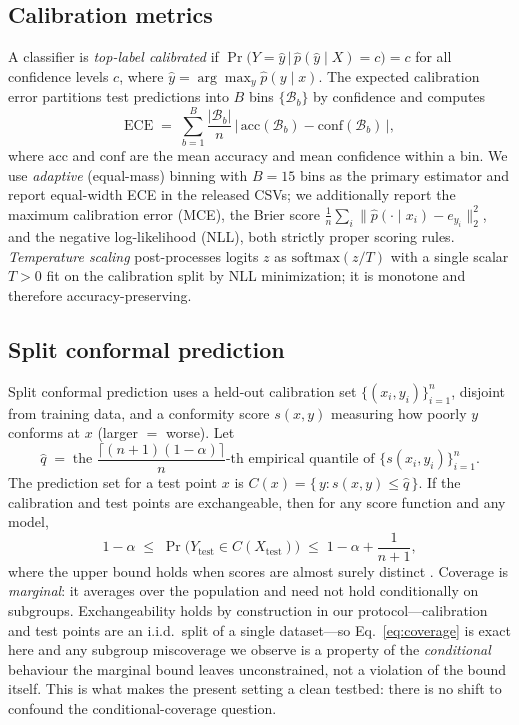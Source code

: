 \documentclass[review,12pt]{elsarticle}
\begin{document}
\subsection{Calibration metrics}
A classifier is \emph{top-label calibrated} if $\Pr\!\big(Y = \hat y \,\big|\, \hat p(\hat y \mid X) = c\big) = c$ for all confidence levels $c$, where $\hat y = \arg\max_y \hat p(y\mid x)$. The expected calibration error partitions test predictions into $B$ bins $\{\mathcal{B}_b\}$ by confidence and computes
\begin{equation}
\mathrm{ECE} \;=\; \sum_{b=1}^{B} \frac{|\mathcal{B}_b|}{n} \,\Big|\, \mathrm{acc}(\mathcal{B}_b) - \mathrm{conf}(\mathcal{B}_b) \,\Big| ,
\label{eq:ece}
\end{equation}
where $\mathrm{acc}$ and $\mathrm{conf}$ are the mean accuracy and mean confidence within a bin. We use \emph{adaptive} (equal-mass) binning with $B = 15$ bins as the primary estimator and report equal-width ECE in the released CSVs; we additionally report the maximum calibration error (MCE), the Brier score $\frac1n\sum_i \|\hat p(\cdot\mid x_i) - e_{y_i}\|_2^2$, and the negative log-likelihood (NLL), both strictly proper scoring rules. \emph{Temperature scaling} \cite{guo2017} post-processes logits $z$ as $\mathrm{softmax}(z/T)$ with a single scalar $T>0$ fit on the calibration split by NLL minimization; it is monotone and therefore accuracy-preserving.

\subsection{Split conformal prediction}
Split conformal prediction \cite{papadopoulos2002,vovk2005} uses a held-out calibration set $\{(x_i, y_i)\}_{i=1}^{n}$, disjoint from training data, and a conformity score $s(x,y)$ measuring how poorly $y$ conforms at $x$ (larger $=$ worse). Let
\begin{equation}
\hat q \;=\; \text{the } \frac{\lceil (n+1)(1-\alpha) \rceil}{n}\text{-th empirical quantile of } \{s(x_i,y_i)\}_{i=1}^{n}.
\label{eq:quantile}
\end{equation}
The prediction set for a test point $x$ is $C(x) = \{\, y : s(x,y) \le \hat q \,\}$. If the calibration and test points are exchangeable, then for any score function and any model,
\begin{equation}
1-\alpha \;\le\; \Pr\big(Y_{\mathrm{test}} \in C(X_{\mathrm{test}})\big) \;\le\; 1-\alpha + \frac{1}{n+1},
\label{eq:coverage}
\end{equation}
where the upper bound holds when scores are almost surely distinct \cite{lei2018,angelopoulos2023}. Coverage is \emph{marginal}: it averages over the population and need not hold conditionally on subgroups. Exchangeability holds by construction in our protocol---calibration and test points are an i.i.d.\ split of a single dataset---so Eq.~\eqref{eq:coverage} is exact here and any subgroup miscoverage we observe is a property of the \emph{conditional} behaviour the marginal bound leaves unconstrained, not a violation of the bound itself. This is what makes the present setting a clean testbed: there is no shift to confound the conditional-coverage question.
\end{document}
